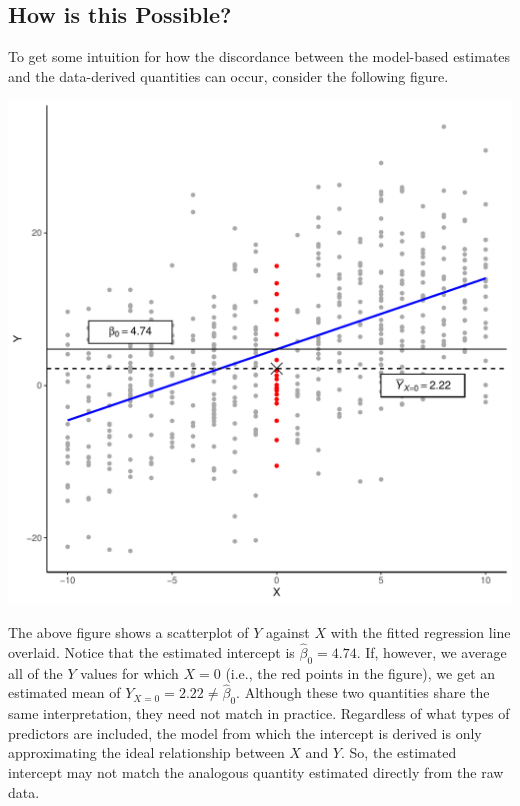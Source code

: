 \documentclass{article}\usepackage[]{graphicx}\usepackage[]{color}
\newenvironment{knitrout}{}{} %
\begin{document}
\subsection{How is this Possible?}

To get some intuition for how the discordance between the model-based estimates
and the data-derived quantities can occur, consider the following figure.

\vspace{12pt}

\begin{knitrout}\footnotesize
{}\color{fgcolor}

{\centering \includegraphics[width=0.85\linewidth]{figure/unnamed-chunk-10-1} 

}



\end{knitrout}

The above figure shows a scatterplot of $Y$ against $X$ with the fitted
regression line overlaid. Notice that the estimated intercept is $\hat{\beta}_0
= 4.74$. If, however, we average all of the $Y$ values for
which $X = 0$ (i.e., the red points in the figure), we get an estimated mean of
$Y_{X = 0} = 2.22 \neq \hat{\beta}_0$. Although these two
quantities share the same interpretation, they need not match in
practice. Regardless of what types of predictors are included, the model from
which the intercept is derived is only approximating the ideal relationship
between $X$ and $Y$. So, the estimated intercept may not match the analogous
quantity estimated directly from the raw data.



\end{document}
